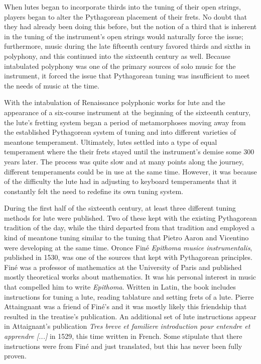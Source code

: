 When lutes began to incorporate thirds into the tuning of their open strings, players
began to alter the Pythagorean placement of their frets.  No doubt that they had already
been doing this before, but the notion of a third that is inherent in the tuning of the
instrument's open strings would naturally force the issue; furthermore, music during the
late fifteenth century favored thirds and sixths in polyphony, and this continued into the
sixteenth century as well. Because intabulated polyphony was one of the primary sources of
solo music for the instrument, it forced the issue that Pythagorean tuning was
insufficient to meet the needs of music at the time.

With the intabulation of Renaissance polyphonic works for lute and the appearance of a
six-course instrument at the beginning of the sixteenth century, the lute's fretting
system began a period of metamorphoses moving away from the established Pythagorean system
of tuning and into different varieties of meantone temperament.  Ultimately, lutes settled
into a type of equal temperament where the their frets stayed until the instrument's
demise some 300 years later.  The process was quite slow and at many points along the
journey, different temperaments could be in use at the same time.  However, it was because
of the difficulty the lute had in adjusting to keyboard temperaments that it constantly
felt the need to redefine its own tuning system.

During the first half of the sixteenth century, at least three different tuning methods
for lute were published.  Two of these kept with the existing Pythagorean tradition of the
day, while the third departed from that tradition and employed a kind of meantone tuning
similar to the tuning that Pietro Aaron and Vicentino were developing at the same time.
Oronce Fin\'{e} \textit{Epithoma musice instrumentalis}, published in 1530, was one of the
sources that kept with Pythagorean principles.  Fin\'{e} was a professor of mathematics at
the University of Paris and published mostly theoretical works about mathematics. It was
his personal interest in music that compelled him to write \textit{Epithoma}. Written in
Latin, the book includes instructions for tuning a lute, reading tablature and setting
frets of a lute.  Pierre Attaingnant was a friend of Fin\'{e}'s and it was mostly likely
this friendship that resulted in the treatise's publication.  An additional set of lute
instructions appear in Attaignant's publication \textit{Tres breve et familiere
introduction pour entendre et apprendre [...]} in 1529, this time written in French.  Some
stipulate that there instructions were from Fin\'{e} and just translated, but this has
never been fully proven.\autocite[1]{PV:1}

